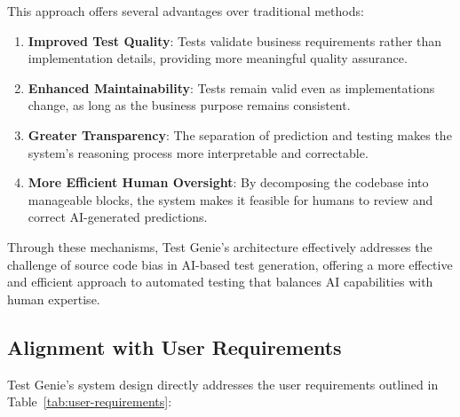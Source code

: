 \hspace{0.5cm}This approach offers several advantages over traditional methods:

\begin{enumerate}
    \item \textbf{Improved Test Quality}: Tests validate business requirements rather than implementation details, providing more meaningful quality assurance.
    
    \item \textbf{Enhanced Maintainability}: Tests remain valid even as implementations change, as long as the business purpose remains consistent.
    
    \item \textbf{Greater Transparency}: The separation of prediction and testing makes the system's reasoning process more interpretable and correctable.
    
    \item \textbf{More Efficient Human Oversight}: By decomposing the codebase into manageable blocks, the system makes it feasible for humans to review and correct AI-generated predictions.
\end{enumerate}

\hspace{0.5cm}Through these mechanisms, Test Genie's architecture effectively addresses the challenge of source code bias in AI-based test generation, offering a more effective and efficient approach to automated testing that balances AI capabilities with human expertise.

\subsection{Alignment with User Requirements}

\hspace{0.5cm}Test Genie's system design directly addresses the user requirements outlined in Table~\ref{tab:user-requirements}:

